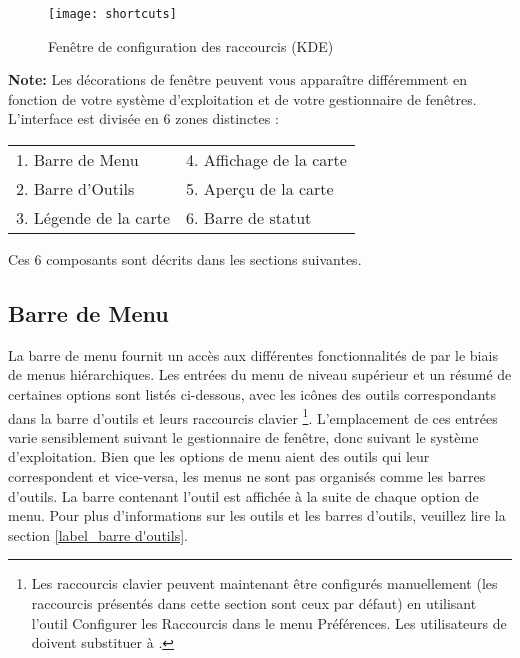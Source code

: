 \begin{figure}[ht]
   \centering
   \texttt{[image: shortcuts]}
   \caption{Fenêtre de configuration des raccourcis \nixcaption (KDE)} \label{fig:shortcuts}
\end{figure}

\textbf{Note:} Les décorations de fenêtre peuvent vous apparaître différemment en fonction de votre système d'exploitation et de votre gestionnaire de fenêtres. \\

L'interface est divisée en 6 zones distinctes :
\begin{center}
\begin{tabular}{p{5cm} p{5cm}}
1. Barre de Menu &4. Affichage de la carte\\
2. Barre d'Outils &5. Aperçu de la carte  \\
3. Légende de la carte &6. Barre de statut \\  
\end{tabular}
\end{center}

Ces 6 composants sont décrits dans les sections suivantes.

\subsection{Barre de Menu} \label{label_menubar}

La barre de menu fournit un accès aux différentes fonctionnalités de \qg par le biais de menus hiérarchiques. Les entrées du menu de niveau supérieur et un résumé de certaines options sont listés ci-dessous, avec les icônes des outils correspondants dans la barre d'outils et leurs raccourcis clavier \footnote{Les raccourcis clavier peuvent maintenant être configurés manuellement (les raccourcis présentés dans cette section sont ceux par défaut) en utilisant l'outil Configurer les Raccourcis dans le menu Préférences. Les utilisateurs de \osx{} doivent substituer  à .}. L'emplacement de ces entrées varie sensiblement suivant le gestionnaire de fenêtre, donc suivant le système d'exploitation. Bien que les options de menu aient des outils qui leur correspondent et vice-versa, les menus ne sont pas organisés comme les barres d'outils. La barre contenant l'outil est affichée à la suite de chaque option de menu. Pour plus d'informations sur les outils et les barres d'outils, veuillez lire la section \ref{label_barre d'outils}.

